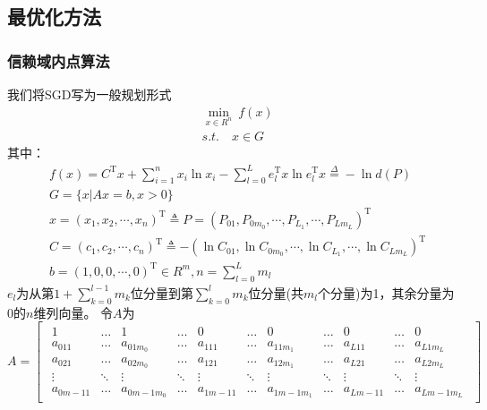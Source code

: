     \subsection{最优化方法}
        \subsubsection{信赖域内点算法}
            \par
            我们将SGD写为一般规划形式
            \begin{align*}
            &\mathop{\min}\limits_{x\in R^n}\  f(x)\\
            &s.t.\quad x\in G
            \end{align*}
            其中：
            \begin{align*}
            &f(x)=C^\mathrm{T} x+\mathop{\sum}\limits_{i=1}^{n}x_i{\ln}x_i-\mathop{\sum}\limits_{l=0}^{L}e_l^\mathrm{T} x{\ln}e_l^\mathrm{T} x\overset{\Delta}{=}-{\ln}d(P)\\
            &G=\{x|Ax=b,x>0\}\\
            &x=(x_1,x_2,\cdots,x_n)^\mathrm{T} \triangleq P = (P_{01},P_{0m_0},\cdots,P_{L_1},\cdots,P_{Lm_L})^\mathrm{T} \\
            &C=(c_1,c_2,\cdots,c_n)^\mathrm{T} \triangleq  -({\ln}C_{01},{\ln}C_{0m_0},\cdots,{\ln}C_{L_1},\cdots,{\ln}C_{Lm_L})^\mathrm{T} \\
            &b=(1,0,0,\cdots,0)^\mathrm{T} \in R^m,n=\mathop{\sum}\limits_{l=0}^{L} m_l
            \end{align*}
            $e_l$为从第$1+\sum_{k=0}^{l-1}m_k$位分量到第$\sum_{k=0}^l m_k$位分量(共$m_l$个分量)为1，其余分量为0的$n$维列向量。
            令$A$为
            \begin{equation*}
            A =
            \begin{bmatrix}
            \begin{smallmatrix}
            1 & \dots & 1&\dots &0 &\dots& 0& \dots &0&\dots &0\\
            a_{011} &\dots & a_{01m_0}&\dots &a_{111} &\dots& a_{11m_1}& \dots &a_{L11}&\dots &a_{L1m_L}\\
            a_{021} &\dots & a_{02m_0}&\dots &a_{121} &\dots& a_{12m_1}& \dots &a_{L21}&\dots &a_{L2m_L}\\
            \vdots& \ddots & \vdots & \ddots & \vdots & \ddots & \vdots & \ddots & \vdots & \ddots & \vdots \\
            a_{0m-11} &\dots & a_{0m-1m_0}&\dots &a_{1m-11} &\dots& a_{1m-1m_1}& \dots &a_{Lm-11}&\dots &a_{Lm-1m_L}
            \end{smallmatrix}
            \end{bmatrix}
            \end{equation*}
